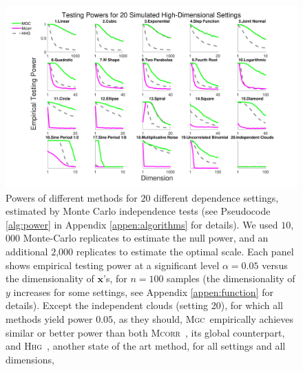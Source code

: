 \documentclass[11pt]{article}
\providecommand{\sct}[1]{{\normalfont\textsc{#1}}}
\providecommand{\mb}[1]{\boldsymbol{#1}}
\newcommand{\Mgc}{\sct{Mgc}}
\newcommand{\Hhg}{\sct{Hhg}}
\newcommand{\Mcorr}{\sct{Mcorr}}
\newcommand{\mbx}{\ensuremath{\mb{x}}}
\newcommand{\mby}{\ensuremath{\mb{y}}}
\begin{document}
\begin{figure}[htbp]
\includegraphics[width=1.0\textwidth]{../Figures/FigHDPower}
\caption{Powers of different methods for $20$ different dependence settings, estimated by Monte Carlo independence tests (see Pseudocode \ref{alg:power} in Appendix \ref{appen:algorithms} for details).  We used $10$,$000$ Monte-Carlo replicates to estimate the null power, and an additional $2$,$000$  replicates to estimate the optimal scale.
Each panel shows empirical testing power at a significant level $\alpha=0.05$
versus the dimensionality of $\mbx$'s, for $n=100$ samples (the dimensionality of $y$ increases for some settings, see Appendix \ref{appen:function} for details). 
Except the independent clouds (setting 20), for which all methods yield power $0.05$, as they should, \Mgc~empirically achieves similar or better power than both \Mcorr~\cite{SzekelyRizzo2013a}, its global counterpart, and \Hhg~\cite{HellerGorfine2013}, another state of the art method, for all settings and all dimensions, 
}
\label{f:nD}
\end{figure}



\end{document}
